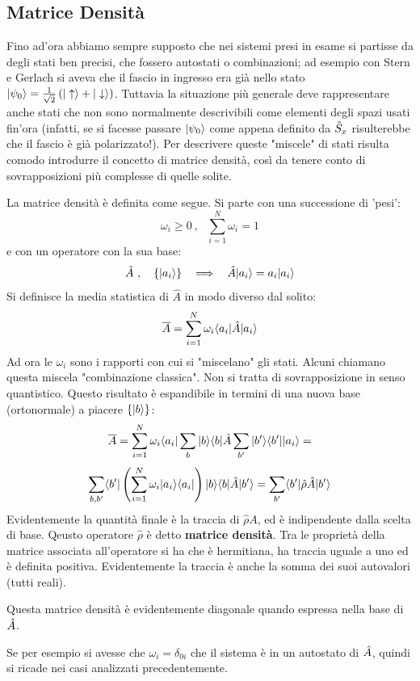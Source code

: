 \subsection{Matrice Densità}
Fino ad'ora abbiamo sempre supposto che nei sistemi presi in esame si partisse da degli stati ben precisi, che fossero autostati o combinazioni; ad esempio con Stern e Gerlach si aveva che il fascio in ingresso era già nello stato $\Ket {\psi_0} = \sqrthalf \l \Ket \uparrow + \Ket \downarrow \r$. Tuttavia  la situazione più generale deve rappresentare anche stati che non sono normalmente descrivibili come elementi degli spazi usati fin'ora (infatti, se si facesse passare $\Ket {\psi_0}$ come appena definito da $\SG{x}$ risulterebbe che il fascio è già polarizzato!). Per descrivere queste "miscele" di stati risulta comodo introdurre il concetto di matrice densità, così da tenere conto di sovrapposizioni più complesse di quelle solite.
\tab

La matrice densità è definita come segue. Si parte con una successione di 'pesi':
\[
    \omega_i \geq 0\ , \ \ \ \sum_{i=1}^{N} \omega_i = 1
\]
e con un operatore con la sua base:
\[
    \hat A \ , \ \ \ \{ \Ket {a_i} \} \ \ \implies \ \ \hat A \Ket {a_i} = a_i \Ket {a_i}  
\]
Si definisce la media statistica di $\hat A$ in modo diverso dal solito:
\[
    \overline A = \sum_{i=1}^{N} \omega_i \Bra {a_i} \hat A \Ket {a_i}
\]
Ad ora le $\omega_i$ sono i rapporti con cui si "miscelano" gli stati. Alcuni chiamano questa miscela "combinazione classica". Non si tratta di sovrapposizione in senso quantistico. Questo risultato è espandibile in termini di una nuova base (ortonormale) a piacere $\{ \Ket b \}$:
\[
    \overline A = \sum_{i=1}^{N} \omega_i \Bra {a_i} \sum_{b} \ketbra{b}{b} \hat A \sum_{b'} \ketbra{b'}{b'} \Ket {a_i} = \]\[
    \sum_{b,b'} \Bra {b'} \left( \sum_{i=1}^{N} \omega_i \ketbra{a_i}{a_i} \right) \Ket {b} \Bra {b} \hat A \Ket {b'} = \sum_{b'}  \Bra {b'} \hat \rho \hat A \Ket {b'}
\]
Evidentemente la quantità finale è la traccia di $\hat \rho A$, ed è indipendente dalla scelta di base. Qeusto operatore $\hat \rho$ è detto \textbf{matrice densità}. Tra le proprietà della matrice associata all'operatore si ha che è hermitiana, ha traccia uguale a uno ed è definita positiva. Evidentemente la traccia è anche la somma dei suoi autovalori (tutti reali).

Questa matrice densità è evidentemente diagonale quando espressa nella base di $\A$.

Se per esempio si avesse che $\omega_i = \delta_{0i}$ che il sistema è in un autostato di $\A$, quindi si ricade nei casi analizzati precedentemente.

